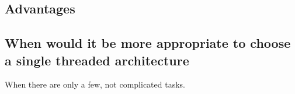 \subsection*{Advantages}

\subsection*{When would it be more appropriate to choose a single threaded
architecture}

When there are only a few, not complicated tasks. 
